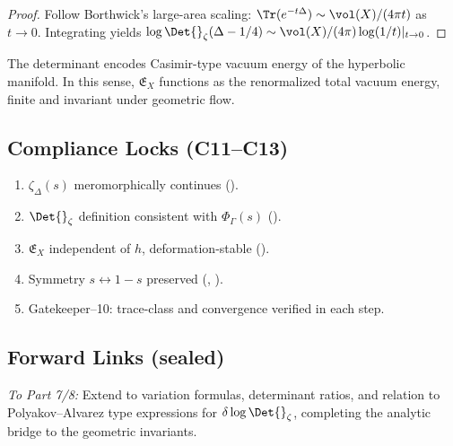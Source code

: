 \begin{proof}\relax
Follow Borthwick’s large-area scaling: $\Tr(e^{-t\Delta})\sim\vol(X)/(4\pi t)$ as $t\to0$. Integrating yields $\log\Det{}_\zeta(\Delta-1/4)\sim\vol(X)/(4\pi)\log(1/t)|_{t\to0}$. %
\end{proof}

\begin{remark}\label{rem:physical-analogy}\relax
The determinant encodes Casimir-type vacuum energy of the hyperbolic manifold.  
In this sense, $\mathfrak{E}_X$ functions as the renormalized total vacuum energy, finite and invariant under geometric flow. %
\end{remark}

\subsection{Compliance Locks (C11–C13)}\relax\hspace{0pt}
\begin{tcolorbox}[colback=gray!3,colframe=gray!50,title={Compliance Check • Part 6/8}] %
\begin{enumerate}[(C11)]
  \item $\zeta_\Delta(s)$ meromorphically continues (). %
  \item $\Det{}_\zeta$ definition consistent with $\Phi_\Gamma(s)$ (). %
  \item $\mathfrak{E}_X$ independent of $h$, deformation-stable (). %
  \item Symmetry $s\leftrightarrow 1-s$ preserved (, ). %
  \item Gatekeeper–10: trace-class and convergence verified in each step. %
\end{enumerate}
\end{tcolorbox}

\subsection*{Forward Links (sealed)}\relax\hspace{0pt}
\noindent
\emph{To Part 7/8:} Extend to variation formulas, determinant ratios, and relation to Polyakov–Alvarez type expressions for $\delta\log\Det{}_\zeta$, completing the analytic bridge to the geometric invariants.\relax\hspace{0pt} %

